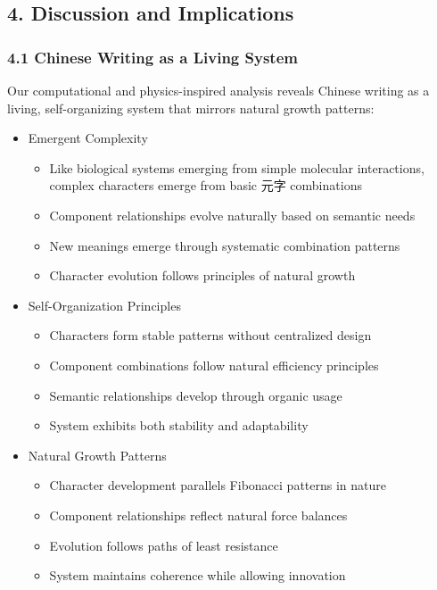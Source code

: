 \documentclass[
]{article}
\providecommand{\tightlist}{%
  \setlength{\itemsep}{0pt}\setlength{\parskip}{0pt}}
\begin{document}
\subsection{4. Discussion and
Implications}\label{discussion-and-implications}

\subsubsection{4.1 Chinese Writing as a Living
System}\label{chinese-writing-as-a-living-system}

Our computational and physics-inspired analysis reveals Chinese writing
as a living, self-organizing system that mirrors natural growth
patterns:

\begin{itemize}
\tightlist
\item
  Emergent Complexity

  \begin{itemize}
  \tightlist
  \item
    Like biological systems emerging from simple molecular interactions,
    complex characters emerge from basic 元字 combinations
  \item
    Component relationships evolve naturally based on semantic needs
  \item
    New meanings emerge through systematic combination patterns
  \item
    Character evolution follows principles of natural growth
  \end{itemize}
\item
  Self-Organization Principles

  \begin{itemize}
  \tightlist
  \item
    Characters form stable patterns without centralized design
  \item
    Component combinations follow natural efficiency principles
  \item
    Semantic relationships develop through organic usage
  \item
    System exhibits both stability and adaptability
  \end{itemize}
\item
  Natural Growth Patterns

  \begin{itemize}
  \tightlist
  \item
    Character development parallels Fibonacci patterns in nature
  \item
    Component relationships reflect natural force balances
  \item
    Evolution follows paths of least resistance
  \item
    System maintains coherence while allowing innovation
  \end{itemize}
\end{itemize}
\end{document}
